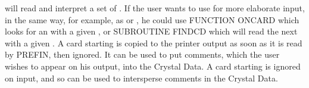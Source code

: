 \ssk\begin{varindent}{1 cm}\end{varindent}
\ssk
will read and interpret a set of .
\p 
If the user wants to use  for more elaborate input, in the same
way, for example, as  or , he could use
FUNCTION ONCARD which looks for an  with a given \cwcomma, or SUBROUTINE
FINDCD which will read the next  with a given \cwcomma.\p
{}
\cardend\newpage
{}
A card starting  is copied to the printer output as soon as it is
read by PREFIN, then ignored.  It can be used to put comments, 
which the user wishes to appear on his output, into
the Crystal Data. 
\p 
A card starting  is ignored on input, and so can be used to
intersperse comments in the Crystal Data.
\p
{}
\cardend
\finchapter
%